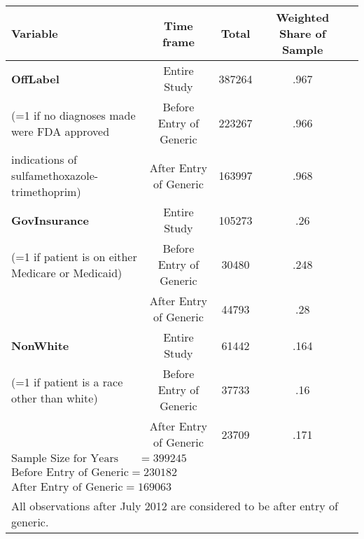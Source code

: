 \begin{tabular}{l*{4}{c}}
\hline\hline
            Variable&\multicolumn{1}{c}{Time frame}&\multicolumn{1}{c}{Total}&\multicolumn{1}{c}{Weighted Share of Sample}\\
\hline
\textbf{OffLabel}                                                &     Entire Study&             387264&      .967\\
(=1 if no diagnoses made were FDA approved          &     Before Entry of Generic&    223267&      .966\\
indications of sulfamethoxazole-trimethoprim)  &     After Entry of Generic&      163997&      .968\\
[1em]
\textbf{GovInsurance}                                            &     Entire Study&             105273&      .26 \\
(=1 if patient is on either Medicare or Medicaid)       &     Before Entry of Generic&     30480 &      .248\\
                                                        &     After Entry of Generic&      44793 &      .28\\
[1em]
\textbf{NonWhite}                                                &     Entire Study&             61442&      .164\\
(=1 if patient is a race other than white)                &     Before Entry of Generic&     37733&      .16\\
                                                        &     After Entry of Generic&      23709&      .171\\
\hline
$\text{Sample Size for Years 2006-2016} = 399245$\\
$\text{Before Entry of Generic} = 230182$\\
$\text{After Entry of Generic} = 169063$\\
\hline\hline
\multicolumn{4}{l}{\footnotesize All observations after July 2012 are considered to be after entry of generic.}\\
\end{tabular}

